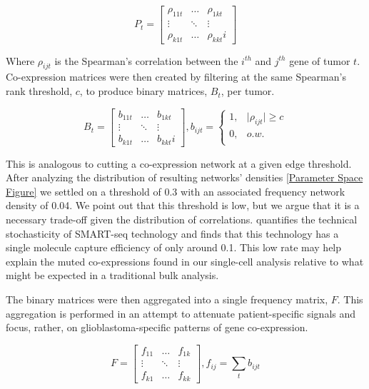 \documentclass[10pt,letterpaper]{article}
\begin{document}
\begin{equation}\label{equation3}
 P_t = \left[ \begin{array}{ccc}
\rho_{11t} & \ldots & \rho_{1kt} \\
\vdots & \ddots & \vdots \\
\rho_{k1t} & \ldots & \rho_{kkt}i \end{array} \right]
\end{equation}

Where $\rho_{ijt}$ is the Spearman’s correlation between the $i^{th}$ and $j^{th}$ gene of tumor $t$. Co-expression matrices were then created by filtering at the same Spearman’s rank threshold, $c$, to produce binary matrices, $B_t$, per tumor. 

\begin{equation}\label{equation4}
B_t = \left[ \begin{array}{ccc}
b_{11t} & \ldots & b_{1kt} \\
\vdots & \ddots & \vdots \\
b_{k1t} & \ldots & b_{kkt}i \end{array}
\right], b_{ijt}= \begin{cases} 
1, & \vert\rho_{ijt}\vert\ge c \\
0, & o.w. \\
\end{cases}
\end{equation}

This is analogous to cutting a co-expression network at a given edge threshold. After analyzing the distribution of resulting networks’ densities \ref{Parameter Space Figure} we settled on a threshold of 0.3 with an associated frequency network density of 0.04. We point out that this threshold is low, but we argue that it is a necessary trade-off given the distribution of correlations. \cite{GK} quantifies the technical stochasticity of SMART-seq technology and finds that this technology has a single molecule capture efficiency of only around 0.1. This low rate may help explain the muted co-expressions found in our single-cell analysis relative to what might be expected in a traditional bulk analysis.

The binary matrices were then aggregated into a single frequency matrix, $F$. This aggregation is performed in an attempt to attenuate patient-specific signals and focus, rather, on glioblastoma-specific patterns of gene co-expression.

\begin{equation}\label{equation5}
F = \left[ \begin{array}{ccc}
f_{11} & \ldots & f_{1k} \\
\vdots & \ddots & \vdots \\
f_{k1} & \ldots & f_{kk} \end{array} \right], f_{ij} = \sum_{t}b_{ijt}
\end{equation}
\end{document}
